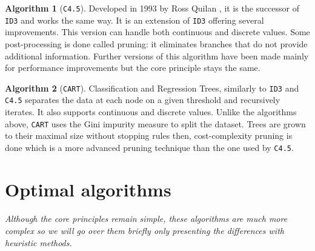 \documentclass[12pt]{report}
\theoremstyle{definition}
\theoremstyle{definition}
\newtheorem*{algo}{Algorithm}
\theoremstyle{definition}
\begin{document}
\begin{algo}[\texttt{C4.5}]
    Developed in 1993 by Ross Quilan \cite{wiki-decision-tree}, it is the successor of \texttt{ID3} and works
    the same way. It is an extension of \texttt{ID3} offering several improvements. This version can handle both
    continuous and discrete values. Some post-processing is done called pruning: it eliminates branches that do
    not provide additional information. Further versions of this algorithm have been made mainly for performance
    improvements but the core principle stays the same.
\end{algo}

\begin{algo}[\texttt{CART}]
    Classification and Regression Trees, similarly to \texttt{ID3} and \texttt{C4.5} separates the data at each node
    on a given threshold and recursively iterates. It also supports continuous and discrete values. Unlike the algorithms
    above, \texttt{CART} uses the Gini impurity measure to split the dataset. Trees are grown to their maximal size
    without stopping rules then, cost-complexity pruning is done which is a more advanced pruning technique
    than the one used by \texttt{C4.5}.
\end{algo}


\section{Optimal algorithms}
\paragraph{} \textit{Although the core principles remain simple, these algorithms are much more complex so we will go
over them briefly only presenting the differences with heuristic methods.}
\end{document}

